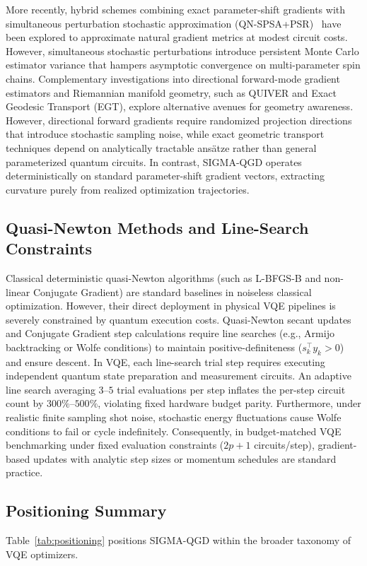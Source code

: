 \documentclass[11pt,a4paper]{article}
\begin{document}
More recently, hybrid schemes combining exact parameter-shift gradients with simultaneous perturbation stochastic approximation (QN-SPSA+PSR)~\cite{qnspsa_psr_2024} have been explored to approximate natural gradient metrics at modest circuit costs. However, simultaneous stochastic perturbations introduce persistent Monte Carlo estimator variance that hampers asymptotic convergence on multi-parameter spin chains. Complementary investigations into directional forward-mode gradient estimators and Riemannian manifold geometry, such as QUIVER and Exact Geodesic Transport (EGT), explore alternative avenues for geometry awareness. However, directional forward gradients require randomized projection directions that introduce stochastic sampling noise, while exact geometric transport techniques depend on analytically tractable ans\"atze rather than general parameterized quantum circuits. In contrast, SIGMA-QGD operates deterministically on standard parameter-shift gradient vectors, extracting curvature purely from realized optimization trajectories.

\subsection{Quasi-Newton Methods and Line-Search Constraints}
Classical deterministic quasi-Newton algorithms (such as L-BFGS-B and non-linear Conjugate Gradient) are standard baselines in noiseless classical optimization. However, their direct deployment in physical VQE pipelines is severely constrained by quantum execution costs. Quasi-Newton secant updates and Conjugate Gradient step calculations require line searches (e.g., Armijo backtracking or Wolfe conditions) to maintain positive-definiteness ($s_k^\top y_k > 0$) and ensure descent. In VQE, each line-search trial step requires executing independent quantum state preparation and measurement circuits. An adaptive line search averaging $3\text{--}5$ trial evaluations per step inflates the per-step circuit count by $300\%\text{--}500\%$, violating fixed hardware budget parity. Furthermore, under realistic finite sampling shot noise, stochastic energy fluctuations cause Wolfe conditions to fail or cycle indefinitely. Consequently, in budget-matched VQE benchmarking under fixed evaluation constraints ($2p+1$ circuits/step), gradient-based updates with analytic step sizes or momentum schedules are standard practice.

\subsection{Positioning Summary}
Table~\ref{tab:positioning} positions SIGMA-QGD within the broader taxonomy of VQE optimizers.
\end{document}
